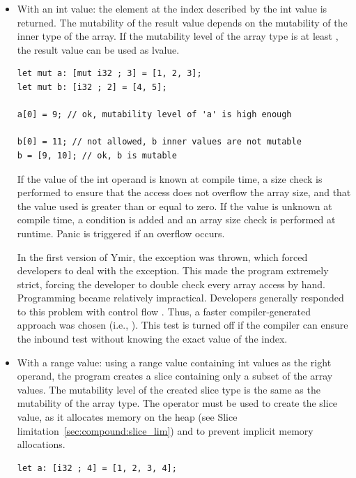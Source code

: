 \begin{itemize}
  \setlength\itemsep{-4pt}
\item With an int value: the element at the index described by the int value is
  returned. The mutability of the result value depends on the mutability of the
  inner type of the array. If the mutability level of the array type is at least
  , the result value can be used as lvalue.

  \begin{lstlisting}[style=coloredverbatimError]
let mut a: [mut i32 ; 3] = [1, 2, 3];
let mut b: [i32 ; 2] = [4, 5];

a[0] = 9; // ok, mutability level of 'a' is high enough

b[0] = 11; // not allowed, b inner values are not mutable
b = [9, 10]; // ok, b is mutable
  \end{lstlisting}

  If the value of the int operand is known at compile time, a size check is
  performed to ensure that the access does not overflow the array size, and that
  the value used is greater than or equal to zero. If the value is unknown at
  compile time, a condition is added and an array size check is performed at
  runtime. Panic is triggered if an overflow occurs.

  In the first version of Ymir, the exception
   was thrown, which forced developers to
  deal with the exception. This made the program extremely strict, forcing the
  developer to double check every array access by hand. Programming became
  relatively impractical. Developers generally responded to this problem with
  control flow . Thus, a faster
  compiler-generated approach was chosen (i.e., ). This
  test is turned off if the compiler can ensure the inbound test without knowing
  the exact value of the index.

\item With a range value: using a range value containing int values as the right
  operand, the program creates a slice containing only a subset of the array
  values. The mutability level of the created slice type is the same as the
  mutability of the array type. The  operator must be used to create
  the slice value, as it allocates memory on the heap (see Slice
  limitation~\ref{sec:compound:slice_lim}) and to prevent implicit memory allocations.

  \begin{lstlisting}[style=coloredverbatim]
let a: [i32 ; 4] = [1, 2, 3, 4];


\end{lstlisting}
\end{itemize}
